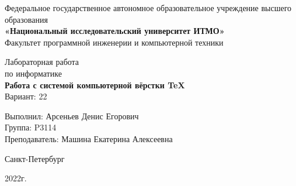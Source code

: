 \begin{center}

Федеральное государственное автономное образовательное учреждение высшего образования\\
\textbf{«Национальный исследовательский университет ИТМО»} \\
Факультет программной инженерии и компьютерной техники

\vspace{20em}

{\Large Лабораторная работа }\\
    {\large по информатике } \\
    \vspace{1em}
    {\Large \textbf{Работа с системой компьютерной вёрстки \TeX}} \\
    Вариант: 22
\end{center}

\vspace{20em}

\begin{flushright}
    Выполнил:
    Арсеньев Денис Егорович\\
    Группа: P3114\\
    Преподаватель:
    Машина Екатерина Алексеевна\\
\end{flushright}

\vspace{8em} 

\begin{center}
Санкт-Петербург

2022г.
\end{center}
